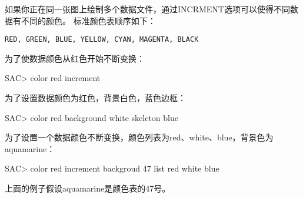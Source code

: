 如果你正在同一张图上绘制多个数据文件，通过INCRMENT选项可以使得不同数据有不同的颜色。
标准颜色表顺序如下：
\begin{verbatim}
RED, GREEN, BLUE, YELLOW, CYAN, MAGENTA, BLACK
\end{verbatim}

为了使数据颜色从红色开始不断变换：
\begin{SACCode}
SAC> color red increment
\end{SACCode}

为了设置数据颜色为红色，背景白色，蓝色边框：
\begin{SACCode}
SAC> color red background white skeleton blue
\end{SACCode}

为了设置一个数据颜色不断变换，颜色列表为red、white、blue，背景色为aquamarine：
\begin{SACCode}
SAC> color red increment backgroud 47 list red white blue
\end{SACCode}
上面的例子假设aquamarine是颜色表的47号。
